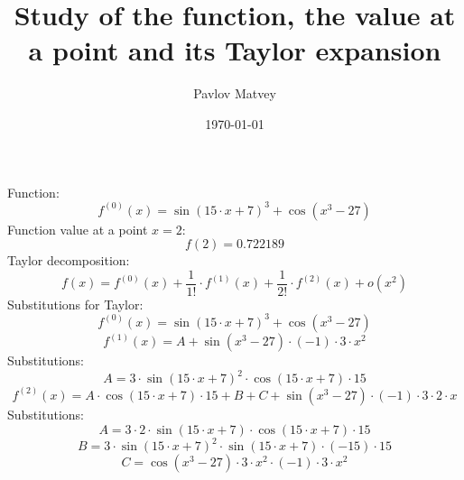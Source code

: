 \documentclass[12pt, letterpaper]{article}
\title {Study of the function, the value at a point and its Taylor expansion}
\author{Pavlov Matvey}
\date{\today}
\begin{document}
\maketitle
Function:\[f^{(0)}(x)=\sin(15 \cdot x+7)^3+\cos(x^3-27)\]
Function value at a point $x=2$: \[f(2)=0.722189\]
Taylor decomposition:
\[f(x)=f^{(0)}(x)+ \frac {1}{1!} \cdot f^{(1)}(x)+ \frac {1}{2!} \cdot f^{(2)}(x)+o(x^2)\]
Substitutions for Taylor:
\[f^{(0)}(x)=\sin(15 \cdot x+7)^3+\cos(x^3-27)\]
\[f^{(1)}(x)=A+\sin(x^3-27) \cdot (-1) \cdot 3 \cdot x^2\]
Substitutions:
\[A=3 \cdot \sin(15 \cdot x+7)^2 \cdot \cos(15 \cdot x+7) \cdot 15\]
\[f^{(2)}(x)=A \cdot \cos(15 \cdot x+7) \cdot 15+B+C+\sin(x^3-27) \cdot (-1) \cdot 3 \cdot 2 \cdot x\]
Substitutions:
\[A=3 \cdot 2 \cdot \sin(15 \cdot x+7) \cdot \cos(15 \cdot x+7) \cdot 15\]
\[B=3 \cdot \sin(15 \cdot x+7)^2 \cdot \sin(15 \cdot x+7) \cdot (-15) \cdot 15\]
\[C=\cos(x^3-27) \cdot 3 \cdot x^2 \cdot (-1) \cdot 3 \cdot x^2\]
\end{document}
